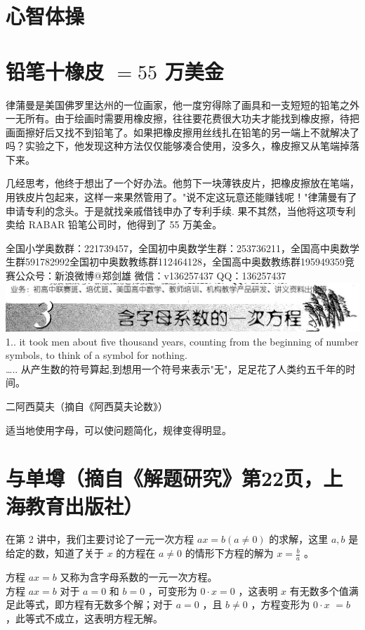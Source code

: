 \documentclass[10pt]{article}
\begin{document}
\section*{心智体操}
\section*{铅笔十橡皮 $=55$ 万美金}
律蒲曼是美国佛罗里达州的一位画家，他一度穷得除了画具和一支短短的铅笔之外一无所有。由于绘画时需要用橡皮擦，往往要花费很大功夫才能找到橡皮擦，待把画面擦好后又找不到铅笔了。如果把橡皮擦用丝线扎在铅笔的另一端上不就解决了吗？实验之下，他发现这种方法仅仅能够凑合使用，没多久，橡皮擦又从笔端掉落下来。

几经思考，他终于想出了一个好办法。他剪下一块薄铁皮片，把橡皮擦放在笔端，用铁皮片包起来，这样一来果然管用了。"说不定这玩意还能赚钱呢！"律蒲曼有了申请专利的念头。于是就找亲戚借钱申办了专利手续. 果不其然，当他将这项专利卖给 RABAR 铅笔公司时，他得到了 55 万美金。

全国小学奥数群：221739457，全国初中奥数学生群：253736211，全国高中奥数学生群591782992全国初中奥数教练群112464128，全国高中奥数教练群195949359竞赛公众号：新浪微博@郑剑雄 微信：v136257437 QQ：136257437\\
\includegraphics[max width=\textwidth, center]{2024_10_30_26b590fd1106d28139f0g-014(1)}\\
1.. it took men about five thousand years, counting from the beginning of number symbols, to think of a symbol for nothing.\\
….. 从产生数的符号算起,到想用一个符号来表示"无"，足足花了人类约五千年的时间。

二阿西莫夫（摘自《阿西莫夫论数》）

适当地使用字母，可以使问题简化，规律变得明显。

\section*{与单墫（摘自《解题研究》第22页，上海教育出版社）}
在第 2 讲中，我们主要讨论了一元一次方程 $a x=b(a \neq 0)$ 的求解，这里 $a, b$ 是给定的数，知道了关于 $x$ 的方程在 $a \neq 0$ 的情形下方程的解为 $x=\frac{b}{a}$ 。

方程 $a x=b$ 又称为含字母系数的一元一次方程。\\
方程 $a x=b$ 对于 $a=0$ 和 $b=0$ ，可变形为 $0 \cdot x=0$ ，这表明 $x$ 有无数多个值满足此等式，即方程有无数多个解；对于 $a=0$ ，且 $b \neq 0$ ，方程变形为 $0 \cdot x$ $=b$ ，此等式不成立，这表明方程无解。
\end{document}
